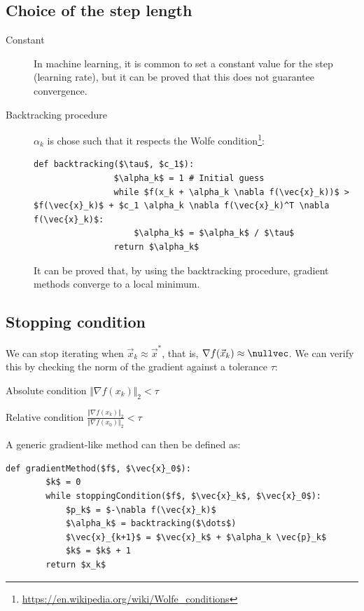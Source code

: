 \subsection{Choice of the step length}
\begin{description}
    \item[Constant] 
        In machine learning, it is common to set a constant value for the step (learning rate), 
        but it can be proved that this does not guarantee convergence.
    
    \item[Backtracking procedure] 
        $\alpha_k$ is chose such that it respects the Wolfe condition\footnote{\url{https://en.wikipedia.org/wiki/Wolfe_conditions}}:
        \begin{lstlisting}[mathescape=true, belowskip = -0.8\baselineskip]
            def backtracking($\tau$, $c_1$):
                $\alpha_k$ = 1 # Initial guess
                while $f(x_k + \alpha_k \nabla f(\vec{x}_k))$ > $f(\vec{x}_k)$ + $c_1 \alpha_k \nabla f(\vec{x}_k)^T \nabla f(\vec{x}_k)$:
                    $\alpha_k$ = $\alpha_k$ / $\tau$
                return $\alpha_k$
        \end{lstlisting}
        It can be proved that, by using the backtracking procedure, gradient methods converge to a local minimum.
\end{description}


\subsection{Stopping condition}
We can stop iterating when $\vec{x}_k \approx \vec{x}^*$, that is, $\nabla f(\vec{x}_k) \approx \nullvec$.
We can verify this by checking the norm of the gradient against a tolerance $\tau$:
\begin{descriptionlist}
    \item[Absolute condition] $\Vert \nabla f(x_k) \Vert_2 < \tau$ 
    \item[Relative condition] $\frac{\Vert \nabla f(x_k) \Vert_2}{\Vert \nabla f(x_0) \Vert_2} < \tau$ 
\end{descriptionlist}

A generic gradient-like method can then be defined as:
\begin{lstlisting}[mathescape=true]
    def gradientMethod($f$, $\vec{x}_0$):
        $k$ = 0
        while stoppingCondition($f$, $\vec{x}_k$, $\vec{x}_0$):
            $p_k$ = $-\nabla f(\vec{x}_k)$
            $\alpha_k$ = backtracking($\dots$)
            $\vec{x}_{k+1}$ = $\vec{x}_k$ + $\alpha_k \vec{p}_k$
            $k$ = $k$ + 1
        return $x_k$
\end{lstlisting}


